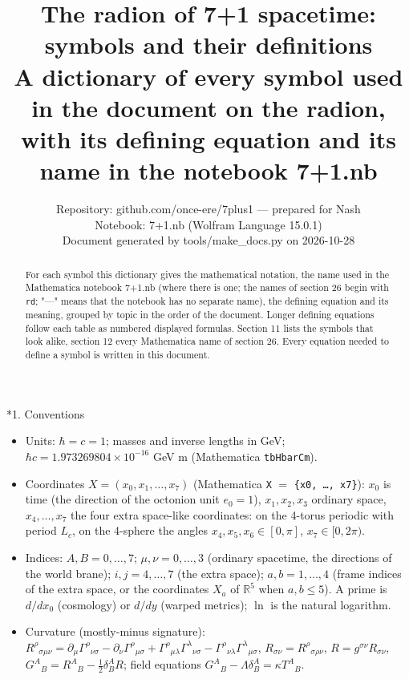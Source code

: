 \documentclass[10pt,a4paper]{article}
\makeatletter
\renewcommand\section{\@startsection{section}{1}{\z@}{-3.5ex \@plus -1ex \@minus -.2ex}{2.3ex \@plus.2ex}{\normalfont\Large\bfseries\raggedright}}
\makeatother
\begin{document}
\title{The radion of 7+1 spacetime: symbols and their definitions\\[0.4em]\large A dictionary of every symbol used in the document on the radion, with its defining equation and its name in the notebook 7+1.nb}
\author{Repository: github.com/once-ere/7plus1 — prepared for Nash\\ Notebook: 7+1.nb (Wolfram Language 15.0.1)\\ Document generated by tools/make\_docs.py on 2026-10-28}
\date{}
\maketitle
\begin{abstract}
For each symbol this dictionary gives the mathematical notation, the name used in the Mathematica notebook 7+1.nb (where there is one; the names of section 26 begin with \texttt{rd}; "—" means that the notebook has no separate name), the defining equation and its meaning, grouped by topic in the order of the document. Longer defining equations follow each table as numbered displayed formulas. Section 11 lists the symbols that look alike, section 12 every Mathematica name of section 26. Every equation needed to define a symbol is written in this document.
\end{abstract}
\tableofcontents
{}\section*{1. Conventions}
\begin{itemize}
\item Units: $\hbar=c=1$; masses and inverse lengths in GeV; $\hbar c=1.973269804\times10^{-16}$ GeV m (Mathematica \texttt{tbHbarCm}).
\item Coordinates $X=(x_0,x_1,\dots,x_7)$ (Mathematica \texttt{X} $=$ \texttt{\{x0, …, x7\}}): $x_0$ is time (the direction of the octonion unit $e_0=1$), $x_1,x_2,x_3$ ordinary space, $x_4,\dots,x_7$ the four extra space-like coordinates: on the 4-torus periodic with period $L_c$, on the 4-sphere the angles $x_4,x_5,x_6\in[0,\pi]$, $x_7\in[0,2\pi)$.
\item Indices: $A,B=0,\dots,7$; $\mu,\nu=0,\dots,3$ (ordinary spacetime, the directions of the world brane); $i,j=4,\dots,7$ (the extra space); $a,b=1,\dots,4$ (frame indices of the extra space, or the coordinates $X_a$ of $\mathbb R^5$ when $a,b\le5$). A prime is $d/dx_0$ (cosmology) or $d/dy$ (warped metrics); $\ln$ is the natural logarithm.
\item Curvature (mostly-minus signature): $R^\rho{}_{\sigma\mu\nu}=\partial_\mu\Gamma^\rho{}_{\nu\sigma}-\partial_\nu\Gamma^\rho{}_{\mu\sigma}+\Gamma^\rho{}_{\mu\lambda}\Gamma^\lambda{}_{\nu\sigma}-\Gamma^\rho{}_{\nu\lambda}\Gamma^\lambda{}_{\mu\sigma}$, $R_{\sigma\nu}=R^\rho{}_{\sigma\rho\nu}$, $R=g^{\sigma\nu}R_{\sigma\nu}$, $G^A{}_B=R^A{}_B-\frac12\delta^A_BR$; field equations $G^A{}_B-\Lambda\delta^A_B=\kappa T^A{}_B$.
\end{itemize}
\end{document}
